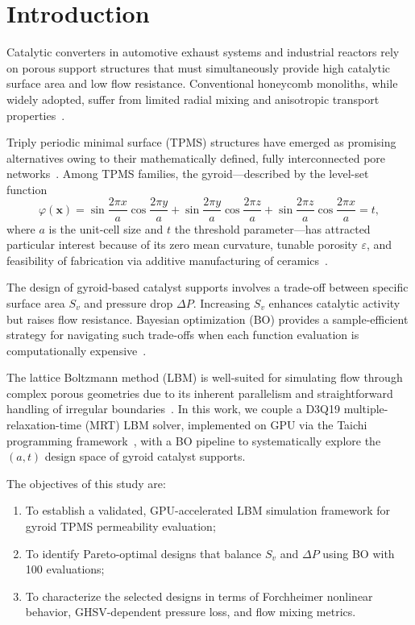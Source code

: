 \section{Introduction}\label{sec:intro}

Catalytic converters in automotive exhaust systems and industrial reactors
rely on porous support structures that must simultaneously provide
high catalytic surface area and low flow resistance.
Conventional honeycomb monoliths, while widely adopted, suffer from
limited radial mixing and anisotropic transport properties~\cite{ref_honeycomb}.

Triply periodic minimal surface (TPMS) structures have emerged as
promising alternatives owing to their mathematically defined,
fully interconnected pore networks~\cite{ref_tpms_review}.
Among TPMS families, the gyroid---described by the level-set function
\begin{equation}\label{eq:gyroid}
  \varphi(\mathbf{x}) =
    \sin\!\frac{2\pi x}{a}\cos\!\frac{2\pi y}{a}
  + \sin\!\frac{2\pi y}{a}\cos\!\frac{2\pi z}{a}
  + \sin\!\frac{2\pi z}{a}\cos\!\frac{2\pi x}{a}
  = t,
\end{equation}
where $a$ is the unit-cell size and $t$ the threshold parameter---has
attracted particular interest because of its zero mean curvature,
tunable porosity $\varepsilon$, and feasibility of fabrication via
additive manufacturing of ceramics~\cite{ref_gyroid_ceramic}.

The design of gyroid-based catalyst supports involves a trade-off
between specific surface area $S_v$ and pressure drop $\Delta P$.
Increasing $S_v$ enhances catalytic activity but raises flow resistance.
Bayesian optimization (BO) provides a sample-efficient strategy for
navigating such trade-offs when each function evaluation is
computationally expensive~\cite{ref_bo_review}.

The lattice Boltzmann method (LBM) is well-suited for simulating
flow through complex porous geometries due to its inherent parallelism
and straightforward handling of irregular boundaries~\cite{ref_lbm_porous}.
In this work, we couple a D3Q19 multiple-relaxation-time (MRT) LBM solver,
implemented on GPU via the Taichi programming framework~\cite{ref_taichi},
with a BO pipeline to systematically explore the $(a, t)$ design space
of gyroid catalyst supports.

The objectives of this study are:
\begin{enumerate}
  \item To establish a validated, GPU-accelerated LBM simulation framework
        for gyroid TPMS permeability evaluation;
  \item To identify Pareto-optimal designs that balance $S_v$ and $\Delta P$
        using BO with 100 evaluations;
  \item To characterize the selected designs in terms of Forchheimer
        nonlinear behavior, GHSV-dependent pressure loss, and flow
        mixing metrics.
\end{enumerate}
